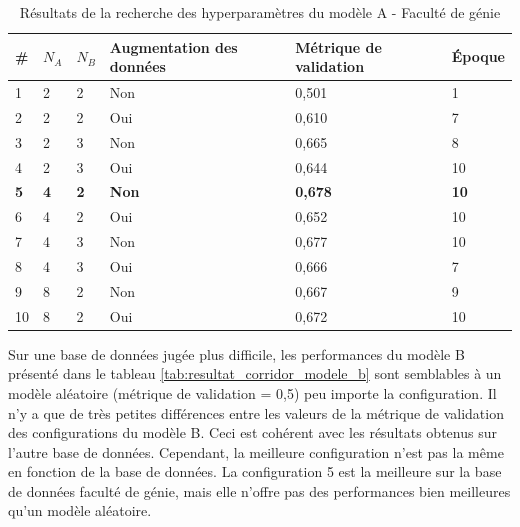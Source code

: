     \begin{table}
        \centering
        \caption{Résultats de la recherche des hyperparamètres du modèle A - Faculté de génie}
        \label{tab:resultat_corridor_modele_a}
        \begin{tabular}{lllp{3cm}p{3cm}l}
            \midrule
            \# & \(N_A\) & \(N_B\) & Augmentation des données & Métrique de validation & Époque\\
            \midrule\midrule
            1  & 2 & 2 & Non & 0,501 & 1\\
            2  & 2 & 2 & Oui & 0,610 & 7\\
            3  & 2 & 3 & Non & 0,665 & 8\\
            4  & 2 & 3 & Oui & 0,644 & 10\\
            \textbf{5}  & \textbf{4} & \textbf{2} & \textbf{Non} & \textbf{0,678} & \textbf{10}\\
            6  & 4 & 2 & Oui & 0,652 & 10\\
            7  & 4 & 3 & Non & 0,677 & 10\\
            8  & 4 & 3 & Oui & 0,666 & 7\\
            9  & 8 & 2 & Non & 0,667 & 9\\
            10 & 8 & 2 & Oui & 0,672 & 10\\
            \midrule
        \end{tabular}
    \end{table}
    
    Sur une base de données jugée plus difficile, les performances du modèle B présenté dans le tableau \ref{tab:resultat_corridor_modele_b} sont semblables à un modèle aléatoire (métrique de validation = 0,5) peu importe la configuration. Il n'y a que de très petites différences entre les valeurs de la métrique de validation des configurations du modèle B. Ceci est cohérent avec les résultats obtenus sur l'autre base de données. Cependant, la meilleure configuration n'est pas la même en fonction de la base de données. La configuration 5 est la meilleure sur la base de données faculté de génie, mais elle n'offre pas des performances bien meilleures qu'un modèle aléatoire.\\
    
